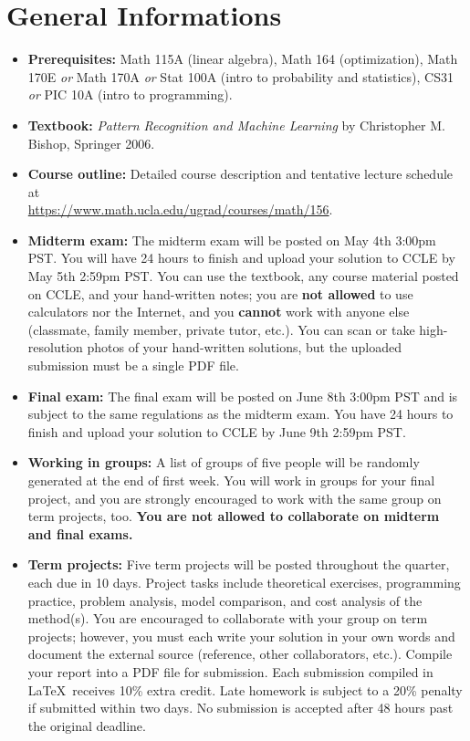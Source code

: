 \documentclass[11pt]{article}
\begin{document}
\section*{General Informations}
\begin{itemize}

  \item \textbf{Prerequisites:} Math 115A (linear algebra), Math 164 (optimization), Math 170E \textit{or} Math 170A \textit{or} Stat 100A (intro to probability and statistics), CS31 \textit{or} PIC 10A (intro to programming).
  
  \item \textbf{Textbook:} \textit{Pattern Recognition and Machine Learning} by Christopher M. Bishop, Springer 2006.
  
  \item \textbf{Course outline:} Detailed course description and tentative lecture schedule at \\ \href{https://www.math.ucla.edu/ugrad/courses/math/156}{https://www.math.ucla.edu/ugrad/courses/math/156}.

  \item \textbf{Midterm exam:} 
   The midterm exam will be posted on May 4th 3:00pm PST.
  You will have 24 hours to finish and upload your solution to CCLE by May 5th 2:59pm PST. 
  You can use the textbook, any course material posted on CCLE, and your hand-written notes; you are \textbf{not allowed} to use calculators nor the Internet, and you \textbf{cannot} work with anyone else (classmate, family member, private tutor, etc.). 
  You can scan or take high-resolution photos of your hand-written solutions, but the uploaded submission must be a single PDF file.
  
  \item\textbf{Final exam:}
  The final exam will be posted on June 8th 3:00pm PST and is subject to the same regulations as the midterm exam. You have 24 hours to finish and upload your solution to CCLE by June 9th 2:59pm PST.
  
  \item \textbf{Working in groups:} 
  A list of groups of five people will be randomly generated at the end of first week. You will work in groups for your final project, and you are strongly encouraged to work with the same group on term projects, too. \textbf{You are not allowed to collaborate on midterm and final exams. }

  \item \textbf{Term projects:}
  Five term projects will be posted throughout the quarter, each due in 10 days. 
  Project tasks include theoretical exercises, programming practice, problem analysis, model comparison, and cost analysis of the method(s). 
  You are encouraged to collaborate with your group on term projects; however, you must each write your solution in your own words and document the external source (reference, other collaborators, etc.).
  Compile your report into a PDF file for submission. 
  Each submission compiled in \LaTeX~receives 10\% extra credit. 
  Late homework is subject to a 20\% penalty if submitted within two days. 
  No submission is accepted after 48 hours past the original deadline. 
  

\end{itemize}
\end{document}
